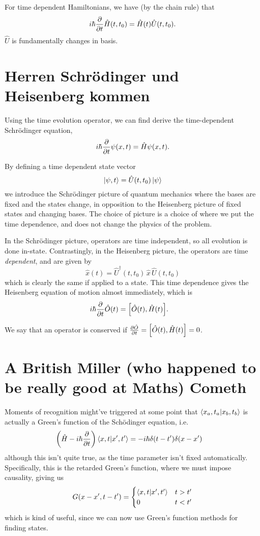 \documentclass[]{revision-notes}
\begin{document}
For time dependent Hamiltonians, we have (by the chain rule) that
\[ i\hbar \pdv{t}\hat{H}(t, t_0) = \hat{H}(t)\hat{U}(t, t_0). \]
\(\hat{U}\) is fundamentally changes in basis.

\section{Herren Schr\"odinger und Heisenberg kommen}
Using the time evolution operator, we can find derive the time-dependent Schr\"odinger equation, \[ i\hbar\pdv{t}\psi(x, t) = \hat{H}\psi(x, t) .\]

By defining a time dependent state vector \[ \ket{\psi, t} = \hat{U}(t, t_0) \ket{\psi} \] we introduce the Schr\"odinger picture of quantum mechanics where the bases are fixed and the states change, in opposition to the Heisenberg picture of fixed states and changing bases.
The choice of picture is a choice of where we put the time dependence, and does not change the physics of the problem.

In the Schr\"odinger picture, operators are time independent, so all evolution is done in-state. Contrastingly, in the Heisenberg picture, the operators are time \emph{dependent}, and are given by \[ \hat{x}(t) = \hat{U}^\dagger(t, t_0)\, \hat{x}\, \hat{U}(t, t_0) \] which is clearly the same if applied to a state. This time dependence gives the Heisenberg equation of motion almost immediately, which is
\begin{align*}
  i\hbar \pdv{t}\hat{O}(t) &= \commutator{\hat{O}(t)}{\hat{H}(t)}.
\end{align*}

We say that an operator is conserved if \(\pdv{\hat{O}}{t} = \commutator{\hat{O}(t)}{\hat{H}(t)} = 0 \).

\section{A British Miller (who happened to be really good at Maths) Cometh}
Moments of recognition might've triggered at some point that \( \braket{x_a, t_a}{x_b, t_b} \) is actually a Green's function of the Sch\"odinger equation, i.e.~
\begin{align*}
  \qty(\hat{H} - i\hbar\pdv{t}) \braket{x, t}{x^\prime, t^\prime} &= -i\hbar \delta(t- t^\prime) \delta(x - x^\prime)
\end{align*}
although this isn't quite true, as the time parameter isn't fixed automatically.
Specifically, this is the retarded Green's function, where we must impose causality, giving us
\begin{equation*}
  G(x-x^\prime, t - t^\prime) =
  \begin{cases}
    \braket{x, t}{x^\prime, t^\prime} & t > t^\prime \\
    0 & t < t^\prime
  \end{cases}
\end{equation*}
which is kind of useful, since we can now use Green's function methods for finding states.
\end{document}
